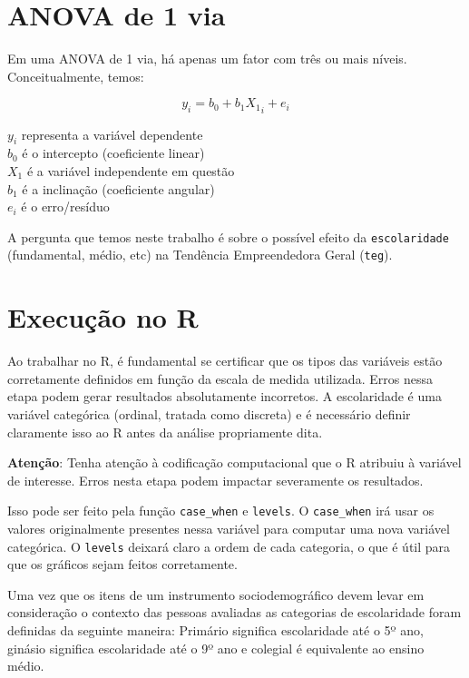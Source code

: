 \documentclass[
]{book}
\begin{document}
\hypertarget{anova-de-1-via}{%
\section{ANOVA de 1 via}\label{anova-de-1-via}}

Em uma ANOVA de 1 via, há apenas um fator com três ou mais níveis. Conceitualmente, temos:

\[y_i = b_0 + b_1X{_1}_i + e_i\]

\(y_i\) representa a variável dependente\\
\(b_0\) é o intercepto (coeficiente linear)\\
\(X_1\) é a variável independente em questão\\
\(b_1\) é a inclinação (coeficiente angular)\\
\(e_i\) é o erro/resíduo

A pergunta que temos neste trabalho é sobre o possível efeito da \texttt{escolaridade} (fundamental, médio, etc) na Tendência Empreendedora Geral (\texttt{teg}).

\hypertarget{execuuxe7uxe3o-no-r-6}{%
\section{Execução no R}\label{execuuxe7uxe3o-no-r-6}}

Ao trabalhar no R, é fundamental se certificar que os tipos das variáveis estão corretamente definidos em função da escala de medida utilizada. Erros nessa etapa podem gerar resultados absolutamente incorretos. A escolaridade é uma variável categórica (ordinal, tratada como discreta) e é necessário definir claramente isso ao R antes da análise propriamente dita.

\textbf{Atenção}: Tenha atenção à codificação computacional que o R atribuiu à variável de interesse. Erros nesta etapa podem impactar severamente os resultados.

Isso pode ser feito pela função \texttt{case\_when} e \texttt{levels}. O \texttt{case\_when} irá usar os valores originalmente presentes nessa variável para computar uma nova variável categórica. O \texttt{levels} deixará claro a ordem de cada categoria, o que é útil para que os gráficos sejam feitos corretamente.

Uma vez que os itens de um instrumento sociodemográfico devem levar em consideração o contexto das pessoas avaliadas as categorias de escolaridade foram definidas da seguinte maneira: Primário significa escolaridade até o 5º ano, ginásio significa escolaridade até o 9º ano e colegial é equivalente ao ensino médio.
\end{document}
